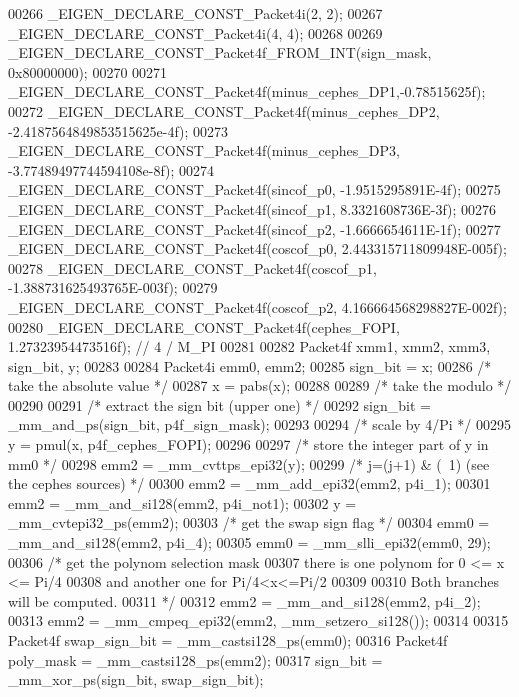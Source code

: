 \begin{DoxyCode}
00266   \_EIGEN\_DECLARE\_CONST\_Packet4i(2, 2);
00267   \_EIGEN\_DECLARE\_CONST\_Packet4i(4, 4);
00268 
00269   \_EIGEN\_DECLARE\_CONST\_Packet4f\_FROM\_INT(sign\_mask, 0x80000000);
00270 
00271   \_EIGEN\_DECLARE\_CONST\_Packet4f(minus\_cephes\_DP1,-0.78515625f);
00272   \_EIGEN\_DECLARE\_CONST\_Packet4f(minus\_cephes\_DP2, -2.4187564849853515625e-4f);
00273   \_EIGEN\_DECLARE\_CONST\_Packet4f(minus\_cephes\_DP3, -3.77489497744594108e-8f);
00274   \_EIGEN\_DECLARE\_CONST\_Packet4f(sincof\_p0, -1.9515295891E-4f);
00275   \_EIGEN\_DECLARE\_CONST\_Packet4f(sincof\_p1,  8.3321608736E-3f);
00276   \_EIGEN\_DECLARE\_CONST\_Packet4f(sincof\_p2, -1.6666654611E-1f);
00277   \_EIGEN\_DECLARE\_CONST\_Packet4f(coscof\_p0,  2.443315711809948E-005f);
00278   \_EIGEN\_DECLARE\_CONST\_Packet4f(coscof\_p1, -1.388731625493765E-003f);
00279   \_EIGEN\_DECLARE\_CONST\_Packet4f(coscof\_p2,  4.166664568298827E-002f);
00280   \_EIGEN\_DECLARE\_CONST\_Packet4f(cephes\_FOPI, 1.27323954473516f); \textcolor{comment}{// 4 / M\_PI}
00281 
00282   Packet4f xmm1, xmm2, xmm3, sign\_bit, y;
00283 
00284   Packet4i emm0, emm2;
00285   sign\_bit = x;
00286   \textcolor{comment}{/* take the absolute value */}
00287   x = pabs(x);
00288 
00289   \textcolor{comment}{/* take the modulo */}
00290 
00291   \textcolor{comment}{/* extract the sign bit (upper one) */}
00292   sign\_bit = \_mm\_and\_ps(sign\_bit, p4f\_sign\_mask);
00293 
00294   \textcolor{comment}{/* scale by 4/Pi */}
00295   y = pmul(x, p4f\_cephes\_FOPI);
00296 
00297   \textcolor{comment}{/* store the integer part of y in mm0 */}
00298   emm2 = \_mm\_cvttps\_epi32(y);
00299   \textcolor{comment}{/* j=(j+1) & (~1) (see the cephes sources) */}
00300   emm2 = \_mm\_add\_epi32(emm2, p4i\_1);
00301   emm2 = \_mm\_and\_si128(emm2, p4i\_not1);
00302   y = \_mm\_cvtepi32\_ps(emm2);
00303   \textcolor{comment}{/* get the swap sign flag */}
00304   emm0 = \_mm\_and\_si128(emm2, p4i\_4);
00305   emm0 = \_mm\_slli\_epi32(emm0, 29);
00306   \textcolor{comment}{/* get the polynom selection mask}
00307 \textcolor{comment}{     there is one polynom for 0 <= x <= Pi/4}
00308 \textcolor{comment}{     and another one for Pi/4<x<=Pi/2}
00309 \textcolor{comment}{}
00310 \textcolor{comment}{     Both branches will be computed.}
00311 \textcolor{comment}{  */}
00312   emm2 = \_mm\_and\_si128(emm2, p4i\_2);
00313   emm2 = \_mm\_cmpeq\_epi32(emm2, \_mm\_setzero\_si128());
00314 
00315   Packet4f swap\_sign\_bit = \_mm\_castsi128\_ps(emm0);
00316   Packet4f poly\_mask = \_mm\_castsi128\_ps(emm2);
00317   sign\_bit = \_mm\_xor\_ps(sign\_bit, swap\_sign\_bit);

\end{DoxyCode}
